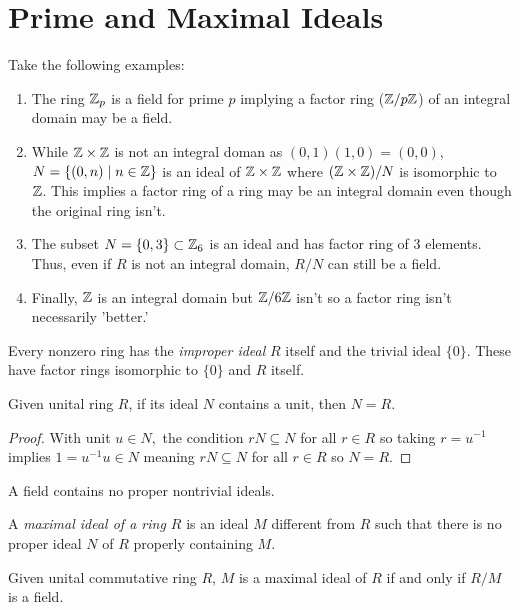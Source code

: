 \section{Prime and Maximal Ideals}

\begin{example}
    Take the following examples:
    \begin{enumerate}[label = (\alph*)]
        \item The ring $\mathbb{Z}_p$ is a field for prime $p$ implying a factor ring ($\mathbb{Z}/p\mathbb{Z}$) of an integral domain may be a field. 
        \item While $\mathbb{Z}\times\mathbb{Z}$ is not an integral doman as $(0,1)(1,0) = (0,0)$, $N = \{(0,n)\mid n\in\mathbb{Z}\}$ is an ideal of $\mathbb{Z}\times\mathbb{Z}$ where $(\mathbb{Z}\times\mathbb{Z})/N$ is isomorphic to $\mathbb{Z}$. This implies a factor ring of a ring may be an integral domain even though the original ring isn't.
        \item The subset $N = \{0,3\} \subset \mathbb{Z}_6$ is an ideal and has factor ring of 3 elements. Thus, even if $R$ is not an integral domain, $R/N$ can still be a field.
        \item Finally, $\mathbb{Z}$ is an integral domain but $\mathbb{Z}/6\mathbb{Z}$ isn't so a factor ring isn't necessarily 'better.'
    \end{enumerate}
\end{example}
\begin{remark}
    Every nonzero ring has the \emph{improper ideal} $R$ itself and the trivial ideal $\{0\}$. These have factor rings isomorphic to $\{0\}$ and $R$ itself.
\end{remark}
\begin{theorem}
    Given unital ring $R$, if its ideal $N$ contains a unit, then $N = R.$
\end{theorem}
\begin{proof}
    With unit $u \in N,$ the condition $rN \subseteq N$ for all $r \in R$ so taking $r = u^{-1}$ implies $1 = u^{-1}u \in N$ meaning $rN \subseteq N$ for all $r \in R$ so $N=R$.
\end{proof}
\begin{corollary}
    A field contains no proper nontrivial ideals.
\end{corollary}
\begin{definition}
    A \emph{maximal ideal of a ring $R$} is an ideal $M$ different from $R$ such that there is no proper ideal $N$ of $R$ properly containing $M$.
\end{definition}
\begin{theorem}
    Given unital commutative ring $R$, $M$ is a maximal ideal of $R$ if and only if $R/M$ is a field.
\end{theorem}
